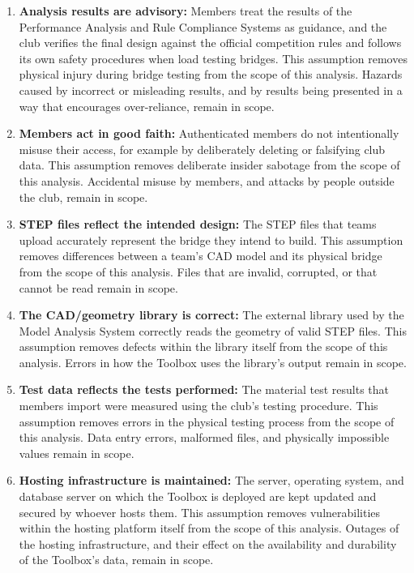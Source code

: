 \documentclass{article}
\begin{document}
\begin{enumerate}
    \item \textbf{Analysis results are advisory:} Members treat the results of
    the Performance Analysis and Rule Compliance Systems as guidance, and the
    club verifies the final design against the official competition rules and
    follows its own safety procedures when load testing bridges. This assumption
    removes physical injury during bridge testing from the scope of this
    analysis. Hazards caused by incorrect or misleading results, and by results
    being presented in a way that encourages over-reliance, remain in scope.

    \item \textbf{Members act in good faith:} Authenticated members do not
    intentionally misuse their access, for example by deliberately deleting or
    falsifying club data. This assumption removes deliberate insider sabotage
    from the scope of this analysis. Accidental misuse by members, and attacks
    by people outside the club, remain in scope.

    \item \textbf{STEP files reflect the intended design:} The STEP files that
    teams upload accurately represent the bridge they intend to build. This
    assumption removes differences between a team's CAD model and its physical
    bridge from the scope of this analysis. Files that are invalid, corrupted, or
    that cannot be read remain in scope.

    \item \textbf{The CAD/geometry library is correct:} The external library used
    by the Model Analysis System correctly reads the geometry of valid STEP
    files. This assumption removes defects within the library itself from the
    scope of this analysis. Errors in how the Toolbox uses the library's output
    remain in scope.

    \item \textbf{Test data reflects the tests performed:} The material test
    results that members import were measured using the club's testing
    procedure. This assumption removes errors in the physical testing process
    from the scope of this analysis. Data entry errors, malformed files, and
    physically impossible values remain in scope.

    \item \textbf{Hosting infrastructure is maintained:} The server, operating
    system, and database server on which the Toolbox is deployed are kept
    updated and secured by whoever hosts them. This assumption removes
    vulnerabilities within the hosting platform itself from the scope of this
    analysis. Outages of the hosting infrastructure, and their effect on the
    availability and durability of the Toolbox's data, remain in scope.
\end{enumerate}
\end{document}
